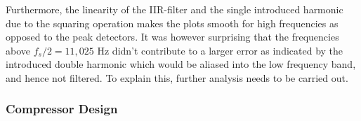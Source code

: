 \documentclass[../main2.tex]{subfiles}
\begin{document}
Furthermore, the linearity of the IIR-filter and the single introduced harmonic due to the squaring operation makes the plots smooth for high frequencies as opposed to the peak detectors. It was however surprising that the frequencies above $f_s/2=11,025$ Hz didn't contribute to a larger error as indicated by the introduced double harmonic which would be aliased into the low frequency band, and hence not filtered. To explain this, further analysis needs to be carried out.

\subsubsection{Compressor Design}
\end{document}
